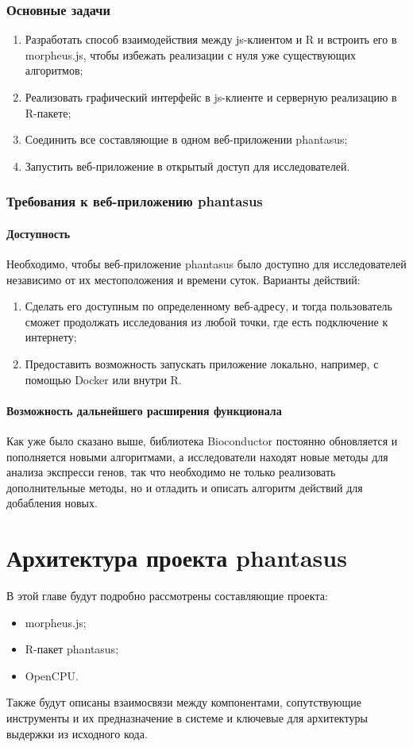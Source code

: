 \documentclass[annotation,specification]{itmo-student-thesis}
\begin{document}
\subsection{Основные задачи}
\begin{enumerate}
\item Разработать способ взаимодействия между js-клиентом и R и встроить его в morpheus.js, чтобы избежать реализации с нуля уже существующих алгоритмов;
\item Реализовать графический интерфейс в js-клиенте и серверную реализацию в R-пакете;
\item Соединить все составляющие в одном веб-приложении phantasus;
\item Запустить веб-приложение в открытый доступ для исследователей.
\end{enumerate}

\subsection{Требования к веб-приложению phantasus}
\subsubsection{Доступность}
Необходимо, чтобы веб-приложение phantasus было доступно для исследователей независимо от их местоположения и времени суток. Варианты действий:

\begin{enumerate}
\item Сделать его доступным по определенному веб-адресу, и тогда пользователь сможет продолжать исследования из любой точки, где есть подключение к интернету;
\item Предоставить возможность запускать приложение локально, например, с помощью Docker или внутри R.
\end{enumerate}

\subsubsection{Возможность дальнейшего расширения функционала}
Как уже было сказано выше, библиотека Bioconductor постоянно обновляется и пополняется новыми алгоритмами, а исследователи находят новые методы для анализа экспресси генов, так что необходимо не только реализовать дополнительные методы, но и отладить и описать алгоритм действий для добабления новых.

\chapterconclusion

\chapter{Архитектура проекта phantasus}
В этой главе будут подробно рассмотрены составляющие проекта:
\begin{itemize}
\item morpheus.js;
\item R-пакет phantasus;
\item OpenCPU.
\end{itemize}
Также будут описаны взаимосвязи между компонентами, сопутствующие инструменты и их предназначение в системе и ключевые для архитектуры выдержки из исходного кода.
\end{document}
